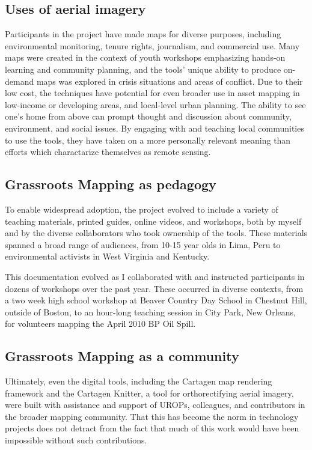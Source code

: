 \documentclass[11pt,oneside,notitlepage]{report}
\begin{document}
\subsection{Uses of aerial imagery}

Participants in the project have made maps for diverse purposes, including environmental monitoring, tenure rights, journalism, and commercial use. Many maps were created in the context of youth workshops emphasizing hands-on learning and community planning, and the tools' unique ability to produce on-demand maps was explored in crisis situations and areas of conflict. Due to their low cost, the techniques have potential for even broader use in asset mapping in low-income or developing areas, and local-level urban planning. The ability to see one's home from above can prompt thought and discussion about community, environment, and social issues. By engaging with and teaching local communities to use the tools, they have taken on a more personally relevant meaning than efforts which charactarize themselves as remote sensing. 
 
\subsection{Grassroots Mapping as pedagogy}

To enable widespread adoption, the project evolved to include a variety of teaching materials, printed guides, online videos, and workshops, both by myself and by the diverse collaborators who took ownership of the tools. These materials spanned a broad range of audiences, from 10-15 year olds in Lima, Peru to environmental activists in West Virginia and Kentucky. 

This documentation evolved as I collaborated with and instructed participants in dozens of workshops over the past year. These occurred in diverse contexts, from a two week high school workshop at Beaver Country Day School in Chestnut Hill, outside of Boston, to an hour-long teaching session in City Park, New Orleans, for volunteers mapping the April 2010 BP Oil Spill. 

\subsection{Grassroots Mapping as a community}

Ultimately, even the digital tools, including the Cartagen map rendering framework and the Cartagen Knitter, a tool for orthorectifying aerial imagery, were built with assistance and support of UROPs, colleagues, and contributors in the broader mapping community. That this has become the norm in technology projects does not detract from the fact that much of this work would have been impossible without such contributions. 
\end{document}

